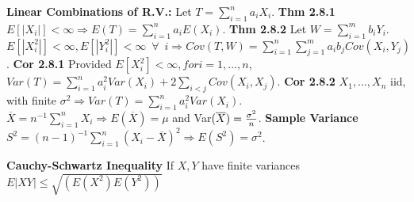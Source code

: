 {{\bf Linear Combinations of R.V.:} Let $T = \sum_{i=1}^na_iX_i$. {\bf Thm 2.8.1}  $E[|X_i|] < \infty \Longrightarrow E(T) = \sum_{i=1}^na_iE(X_i)$.%
{\bf Thm 2.8.2} Let $W = \sum_{i=1}^mb_iY_i$. $E[|X_i^2|] < \infty, E[|Y_i^2|] < \infty\enspace \forall\enspace i \Longrightarrow Cov(T,W) = \sum_{i=1}^n\sum_{j=1}^ma_ib_jCov(X_i,Y_j)$.
{\bf Cor 2.8.1} Provided $E[X_i^2] < \infty, for i = 1,\dots,n$, $Var(T)=\sum_{i=1}^n{a_i^2Var(X_i)+2\sum_{i<j}Cov(X_i,X_j)}$.\quad
{\bf Cor 2.8.2} $X_1,\dots,X_n$ iid, with finite $\sigma^2 \Longrightarrow Var(T) = \sum_{i=1}^na_i^2Var(X_i)$.\quad
${\overline X} = n^{-1}\sum_{i=1}^nX_i \Rightarrow E(\overline X) = \mu$ and Var$({\overline X}) = {\sigma^2 \over n}$.\quad
{\bf Sample Variance} $S^2 = (n-1)^{-1}\sum_{i=1}^n(X_i-{\overline X})^2 \Rightarrow E(S^2)=\sigma^2$.\quad

{\bf Cauchy-Schwartz Inequality} If $X,Y$ have finite variances $E|XY|\leq\sqrt{(E(X^2)E(Y^2))}$

}
